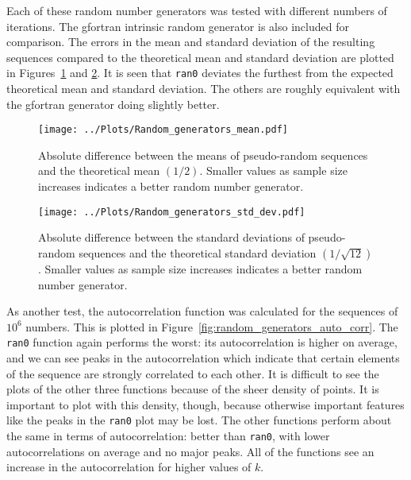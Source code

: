 \documentclass[twocolumn]{myarticle}
\begin{document}
Each of these random number generators was tested with different numbers of iterations.
The gfortran intrinsic random generator is also included for comparison.
The errors in the mean and standard deviation of the resulting sequences compared to the theoretical mean and standard deviation are plotted in Figures~\ref{fig:random_generators_mean} and \ref{fig:random_generators_std_dev}.
It is seen that \texttt{ran0} deviates the furthest from the expected theoretical mean and standard deviation.
The others are roughly equivalent with the gfortran generator doing slightly better.

\begin{figure}[ht!]
    \begin{center}
    \texttt{[image: ../Plots/Random\_generators\_mean.pdf]}
    \caption{%
        Absolute difference between the means of pseudo-random sequences and the theoretical mean $ (1/2) $.
        Smaller values as sample size increases indicates a better random number generator.
    }
    \label{fig:random_generators_mean}
    \end{center}
\end{figure}

\begin{figure}[ht!]
    \begin{center}
    \texttt{[image: ../Plots/Random\_generators\_std\_dev.pdf]}
    \caption{%
        Absolute difference between the standard deviations of pseudo-random sequences and the theoretical standard deviation $ (1/\sqrt{12}) $.
        Smaller values as sample size increases indicates a better random number generator.
    }
    \label{fig:random_generators_std_dev}
    \end{center}
\end{figure}

As another test, the autocorrelation function was calculated for the sequences of $ 10^6 $ numbers.
This is plotted in Figure~\ref{fig:random_generators_auto_corr}.
The \texttt{ran0} function again performs the worst: its autocorrelation is higher on average, and we can see peaks in the autocorrelation which indicate that certain elements of the sequence are strongly correlated to each other.
It is difficult to see the plots of the other three functions because of the sheer density of points.
It is important to plot with this density, though, because otherwise important features like the peaks in the \texttt{ran0} plot may be lost.
The other functions perform about the same in terms of autocorrelation: better than \texttt{ran0}, with lower autocorrelations on average and no major peaks.
All of the functions see an increase in the autocorrelation for higher values of $ k $.
\end{document}
